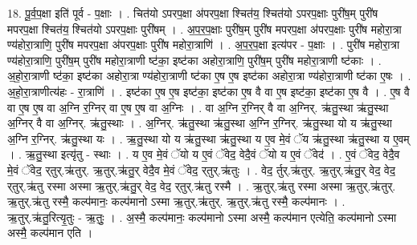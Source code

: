 \documentclass[17pt]{extarticle}
\begin{document}
18. पू॒र्व॒प॒क्षा इति॑ पूर्व - प॒क्षाः । . चित॑यो ऽपरप॒क्षा अ॑परप॒क्षा श्चित॑य॒ श्चित॑यो ऽपरप॒क्षाः पुरी॑ष॒म् पुरी॑ष मपरप॒क्षा श्चित॑य॒ श्चित॑यो ऽपरप॒क्षाः पुरी॑षम् । . अ॒प॒र॒प॒क्षाः पुरी॑ष॒म् पुरी॑ष मपरप॒क्षा अ॑परप॒क्षाः पुरी॑ष महोरा॒त्रा ण्य॑होरा॒त्राणि॒ पुरी॑ष मपरप॒क्षा अ॑परप॒क्षाः पुरी॑ष महोरा॒त्राणि॑ । . अ॒प॒र॒प॒क्षा इत्य॑पर - प॒क्षाः । . पुरी॑ष महोरा॒त्रा ण्य॑होरा॒त्राणि॒ पुरी॑ष॒म् पुरी॑ष महोरा॒त्राणी ष्ट॑का॒ इष्ट॑का अहोरा॒त्राणि॒ पुरी॑ष॒म् पुरी॑ष महोरा॒त्राणी ष्ट॑काः । . अ॒हो॒रा॒त्राणी ष्ट॑का॒ इष्ट॑का अहोरा॒त्रा ण्य॑होरा॒त्राणी ष्ट॑का ए॒ष ए॒ष इष्ट॑का अहोरा॒त्रा ण्य॑होरा॒त्राणी ष्ट॑का ए॒षः । . अ॒हो॒रा॒त्राणीत्य॑हः - रा॒त्राणि॑ । . इष्ट॑का ए॒ष ए॒ष इष्ट॑का॒ इष्ट॑का ए॒ष वै वा ए॒ष इष्ट॑का॒ इष्ट॑का ए॒ष वै । . ए॒ष वै वा ए॒ष ए॒ष वा अ॒ग्नि र॒ग्निर् वा ए॒ष ए॒ष वा अ॒ग्निः । . वा अ॒ग्नि र॒ग्निर् वै वा अ॒ग्निर्. ऋ॑तु॒स्था ऋ॑तु॒स्था अ॒ग्निर् वै वा अ॒ग्निर्. ऋ॑तु॒स्थाः । . अ॒ग्निर्. ऋ॑तु॒स्था ऋ॑तु॒स्था अ॒ग्नि र॒ग्निर्. ऋ॑तु॒स्था यो य ऋ॑तु॒स्था अ॒ग्नि र॒ग्निर्. ऋ॑तु॒स्था यः । . ऋ॒तु॒स्था यो य ऋ॑तु॒स्था ऋ॑तु॒स्था य ए॒व मे॒वं ॅय ऋ॑तु॒स्था ऋ॑तु॒स्था य ए॒वम् । . ऋ॒तु॒स्था इत्यृ॑तु - स्थाः । . य ए॒व मे॒वं ॅयो य ए॒वं ॅवेद॒ वेदै॒वं ॅयो य ए॒वं ॅवेद॑ । . ए॒वं ॅवेद॒ वेदै॒व मे॒वं ॅवेद॒ र्‌तुर्.ऋ॑तुर्. ऋ॒तुर्.ऋ॑तु॒र् वेदै॒व मे॒वं ॅवेद॒ र्‌तुर्.ऋ॑तुः । . वेद॒ र्तुर्.ऋ॑तुर्. ऋ॒तुर्.ऋ॑तु॒र् वेद॒ वेद॒ र्‌तुर्.ऋ॑तु रस्मा अस्मा ऋ॒तुर्.ऋ॑तु॒र् वेद॒ वेद॒ र्‌तुर्.ऋ॑तु रस्मै । . ऋ॒तुर्.ऋ॑तु रस्मा अस्मा ऋ॒तुर्.ऋ॑तुर्. ऋ॒तुर्.ऋ॑तु रस्मै॒ कल्प॑मानः॒ कल्प॑मानो ऽस्मा ऋ॒तुर्.ऋ॑तुर्. ऋ॒तुर्.ऋ॑तु रस्मै॒ कल्प॑मानः । . ऋ॒तुर्.ऋ॑तु॒रित्यृ॒तुः - ऋ॒तुः॒ । . अ॒स्मै॒ कल्प॑मानः॒ कल्प॑मानो ऽस्मा अस्मै॒ कल्प॑मान एत्येति॒ कल्प॑मानो ऽस्मा अस्मै॒ कल्प॑मान एति । \newline
\end{document}
